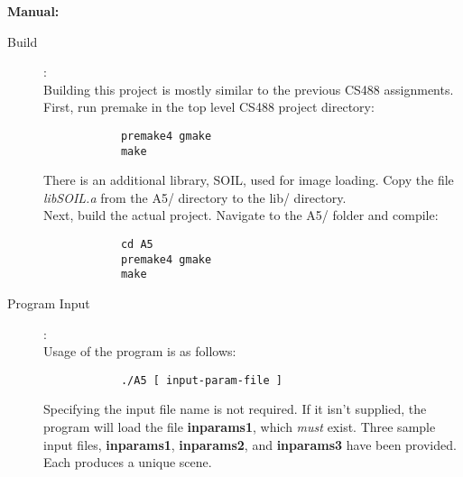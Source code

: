 \documentclass{article}
\begin{document}
\Large\textbf{Manual:}
\normalsize
	\begin{description}
	\item[Build]:\\
		Building this project is mostly similar to the previous CS488 assignments. First, run premake in the top level CS488 project directory:
		\begin{verbatim}
			premake4 gmake
			make
		\end{verbatim}
		There is an additional library, SOIL, used for image loading. Copy the file \textit{libSOIL.a} from the A5/ directory to the lib/ directory. \\
		Next, build the actual project. Navigate to the A5/ folder and compile:
		\begin{verbatim}
			cd A5
			premake4 gmake
			make
		\end{verbatim}

	\item[Program Input]:\\
		Usage of the program is as follows:
		\begin{verbatim}
			./A5 [ input-param-file ]
		\end{verbatim}
		Specifying the input file name is not required. If it isn't supplied, the program will load the file \textbf{inparams1}, which \textit{must} exist. Three sample input files, \textbf{inparams1}, \textbf{inparams2}, and \textbf{inparams3} have been provided. Each produces a unique scene.


\end{description}
\end{document}
